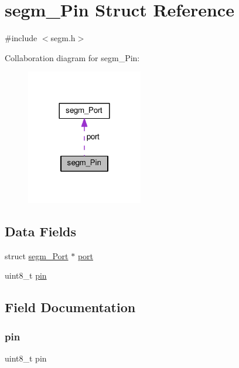 \hypertarget{structsegm___pin}{}\section{segm\+\_\+\+Pin Struct Reference}
\label{structsegm___pin}


{\ttfamily \#include $<$segm.\+h$>$}



Collaboration diagram for segm\+\_\+\+Pin\+:\nopagebreak
\begin{figure}[H]
\begin{center}
\leavevmode
\includegraphics[width=144pt]{structsegm___pin__coll__graph}
\end{center}
\end{figure}
\subsection*{Data Fields}
\begin{DoxyCompactItemize}
\item 
struct \mbox{\hyperlink{structsegm___port}{segm\+\_\+\+Port}} $\ast$ \mbox{\hyperlink{structsegm___pin_a32bf9b7b4087810656144bd9bd1114bb}{port}}
\item 
uint8\+\_\+t \mbox{\hyperlink{structsegm___pin_ab40a673fb19c1e650e1f79de91788aa5}{pin}}
\end{DoxyCompactItemize}


\subsection{Field Documentation}
\mbox{\label{structsegm___pin_ab40a673fb19c1e650e1f79de91788aa5}} 
\subsubsection{\texorpdfstring{pin}{pin}}
{\footnotesize\ttfamily uint8\+\_\+t pin}

